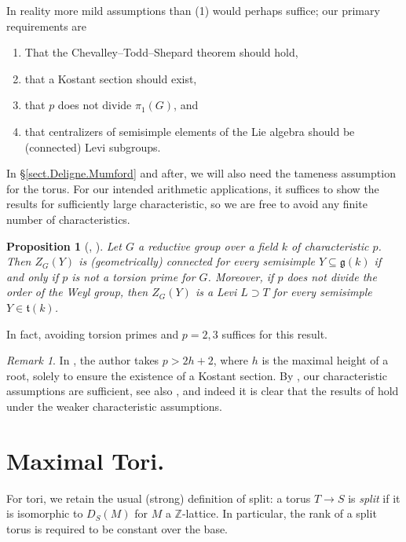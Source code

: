 \documentclass[openany]{amsbook}
\newtheorem{proposition}[theorem]{Proposition}
\theoremstyle{definition}
\theoremstyle{remark}
\newtheorem{remark}[theorem]{Remark}
\numberwithin{equation}{section}
\newcommand{\Z}{\mathbb{Z}}
\renewcommand{\-}{\operatorname{-}}
\newcommand{\ft}{\mathfrak{t}}
\renewcommand{\fg}{\mathfrak{g}}
\begin{document}
In reality more mild assumptions than (1) would perhaps suffice; our primary requirements are 
\begin{enumerate}
    \item That the Chevalley--Todd--Shepard theorem should hold, 
    \item that a Kostant section should exist,
    \item that $p$ does not divide $\pi_1(G)$, and
    \item that centralizers of semisimple elements of the Lie algebra should be (connected) Levi subgroups.
\end{enumerate}
In \S \ref{sect.Deligne.Mumford} and after, we will also need the tameness assumption for the torus. For our intended arithmetic applications, it suffices to show the results for sufficiently large characteristic, so we are free to avoid any finite number of characteristics. 

\begin{proposition}[{{{\cite[Theorem 3.14]{steinbergtors}, \cite[Proposition 14.1.1]{gkmcodims}}}}]\label{prop.goodcharcentralizers}
    Let $G$ a reductive group over a field $k$ of characteristic $p$. Then $Z_G(Y)$ is (geometrically) connected for every semisimple $Y \subseteq \fg(k)$ if and only if $p$ is not a torsion prime for $G$. Moreover, if $p$ does not divide the order of the Weyl group, then $Z_G(Y)$ is a Levi $L \supset T$ for every semisimple $Y \in \ft(k)$.
\end{proposition}
In fact, avoiding torsion primes and $p = 2,3$ suffices for this result.

\begin{remark}
    In \cite{ngofl}, the author takes $p > 2h+2$, where $h$ is the maximal height of a root, solely to ensure the existence of a Kostant section. By \cite[Theorem 3.2.2]{richekostant}, our characteristic assumptions are sufficient, see also \cite{bouthierprodform}, and indeed it is clear that the results of \cite{ngofl} hold under the weaker characteristic assumptions.
\end{remark}




\section{Maximal Tori.} For tori, we retain the usual (strong) definition of split: a torus $T \to S$ is \emph{split} if it is isomorphic to $D_S(M)$ for $M$ a $\Z$-lattice. In particular, the rank of a split torus is required to be constant over the base.
\end{document}
